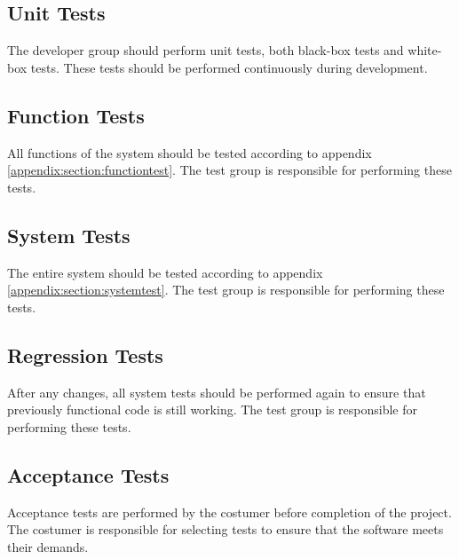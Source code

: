 \documentclass[a4paper]{article}
\begin{document}
\subsection{Unit Tests}
The developer group should perform unit tests, both black-box tests and white-box tests. These tests should be performed continuously during development.

\subsection{Function Tests}
All functions of the system should be tested according to appendix \ref{appendix:section:functiontest}. The test group is responsible for  performing these tests.

\subsection{System Tests}
The entire system should be tested according to appendix \ref{appendix:section:systemtest}. The test group is responsible for performing these tests. 

\subsection{Regression Tests}
After any changes, all system tests should be performed again to ensure that previously functional code is still working. The test group is responsible for performing these tests.

\subsection{Acceptance Tests}
Acceptance tests are performed by the costumer before completion of the project. The costumer is responsible for selecting tests to ensure that the software meets their demands.
\end{document}
